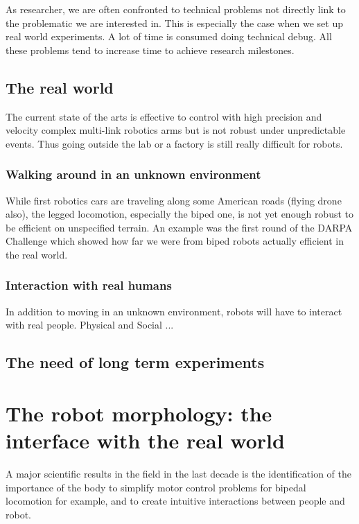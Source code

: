 As researcher, we  are often confronted to technical problems not directly link to the problematic we are interested in. This is especially the case when we set up real world experiments. A lot of time is consumed doing technical debug. All these problems tend to increase time to achieve research milestones.


\subsection{The real world} %

The current state of the arts is effective to control with high precision and velocity complex multi-link robotics arms but is not robust under unpredictable events. Thus going outside the lab or a factory is still really difficult for robots.

\subsubsection{Walking around in an unknown environment} %
While first robotics cars are traveling along some American roads (flying drone also), the legged locomotion, especially the biped one, is not yet enough robust to be efficient on unspecified terrain. An example was the first round of the DARPA Challenge which showed how far we were from biped robots actually efficient in the real world.


\subsubsection{Interaction with real humans} %
In addition to moving in an unknown environment, robots will have to interact with real people.
Physical and Social ...


\subsection{The need of long term experiments} %


\section{The robot morphology: the interface with the real world} %

A major scientific results in the field in the last decade is the identification of the importance of the body to simplify motor control problems for bipedal locomotion for example, and to create intuitive interactions between people and robot.

